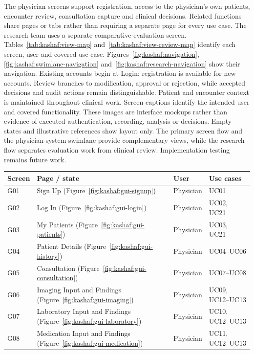 The physician screens support registration, access to the physician's own patients, encounter review, consultation capture and clinical decisions. Related functions share pages or tabs rather than requiring a separate page for every use case. The research team uses a separate comparative-evaluation screen. Tables~\ref{tab:kashaf:view-map} and~\ref{tab:kashaf:view-review-map} identify each screen, user and covered use case. Figures~\ref{fig:kashaf:navigation}, \ref{fig:kashaf:swimlane-navigation} and~\ref{fig:kashaf:research-navigation} show their navigation. Existing accounts begin at Login; registration is available for new accounts. Review branches to modification, approval or rejection, while accepted decisions and audit actions remain distinguishable. Patient and encounter context is maintained throughout clinical work. Screen captions identify the intended user and covered functionality. These images are interface mockups rather than evidence of executed authentication, recording, analysis or decisions. Empty states and illustrative references show layout only. The primary screen flow and the physician-system swimlane provide complementary views, while the research flow separates evaluation work from clinical review. Implementation testing remains future work.

\begin{reporttable}
\centering
\small
\caption{Physician access, patient and input screens mapped to users and use cases.}
\label{tab:kashaf:view-map}
\begin{tabular}{|p{}|p{}|p{}|p{}|}
\hline
Screen & Page / state & User & Use cases \\ \hline
G01 & Sign Up (Figure~\ref{fig:kashaf:gui-signup}) & Physician & UC01 \\ \hline
G02 & Log In (Figure~\ref{fig:kashaf:gui-login}) & Physician & UC02, UC21 \\ \hline
G03 & My Patients (Figure~\ref{fig:kashaf:gui-patients}) & Physician & UC03, UC21 \\ \hline
G04 & Patient Details (Figure~\ref{fig:kashaf:gui-history}) & Physician & UC04--UC06 \\ \hline
G05 & Consultation (Figure~\ref{fig:kashaf:gui-consultation}) & Physician & UC07--UC08 \\ \hline
G06 & Imaging Input and Findings (Figure~\ref{fig:kashaf:gui-imaging}) & Physician & UC09, UC12--UC13 \\ \hline
G07 & Laboratory Input and Findings (Figure~\ref{fig:kashaf:gui-laboratory}) & Physician & UC10, UC12--UC13 \\ \hline
G08 & Medication Input and Findings (Figure~\ref{fig:kashaf:gui-medication}) & Physician & UC11, UC12--UC13 \\ \hline
\end{tabular}
\end{reporttable}

